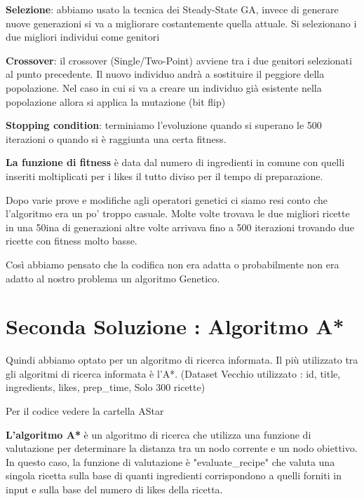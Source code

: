 \documentclass[12pt]{report}
\begin{document}
\textbf{Selezione}: abbiamo usato la tecnica dei Steady-State GA, invece di generare nuove generazioni si va a migliorare costantemente quella attuale. Si selezionano i due migliori individui come genitori

\textbf{Crossover}: il crossover (Single/Two-Point) avviene tra i due genitori selezionati al punto precedente. Il nuovo individuo andrà a sostituire il peggiore della popolazione. Nel caso in cui si va a creare un individuo già esistente nella popolazione allora si applica la mutazione (bit flip)

\textbf{Stopping condition}: terminiamo l’evoluzione quando si superano le 500 iterazioni o quando si è raggiunta una certa fitness.

\textbf{La funzione di fitness} è data dal numero di ingredienti in comune con quelli inseriti moltiplicati per i likes  il tutto diviso per il tempo di preparazione.

Dopo varie prove e modifiche agli operatori genetici ci siamo resi conto che l’algoritmo era un po' troppo casuale. Molte volte trovava le due migliori ricette in una 50ina di generazioni altre volte arrivava fino a 500 iterazioni trovando due ricette con fitness molto basse.

Così abbiamo pensato che la codifica non era adatta o probabilmente non era adatto al nostro problema un algoritmo Genetico.

\chapter{Seconda Soluzione : Algoritmo A*}

Quindi abbiamo optato per un algoritmo di ricerca informata. Il più utilizzato tra gli algoritmi di ricerca informata è l’A*. (Dataset Vecchio utilizzato : id, title, ingredients, likes, prep\_time, Solo 300 ricette)

Per il codice vedere la cartella AStar

\textbf{L'algoritmo A*} è un algoritmo di ricerca che utilizza una funzione di valutazione per determinare la distanza tra un nodo corrente e un nodo obiettivo. In questo caso, la funzione di valutazione è "evaluate\_recipe" che valuta una singola ricetta sulla base di quanti ingredienti corrispondono a quelli forniti in input e sulla base del numero di likes della ricetta.
\end{document}
